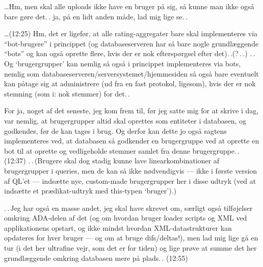 \documentclass{report}
\begin{document}
\ldots Hm, men skal alle uploads ikke have en bruger på sig, så kunne man ikke også bare gøre det.\,. ja, på en lidt anden måde, lad mig lige se.\,. 

\ldots (12:25) Hm, det er ligefør, at alle rating-aggregater bare skal implementeres via ``bot-brugere'' i princippet (og databaseserveren har så bare nogle grundlæggende ``bots'' og kan også oprette flere, hvis der er nok efterspørgsel efter det).\,.(?\,.\,.) 
.\,.\,Og `brugergrupper' kan nemlig så også i princippet implementeres via bots, nemlig som databaseserveren/serversystemet/hjemmesiden så også bare eventuelt kan påtage sig at administrere (ud fra en fast protokol, ligesom), hvis der er nok stemning (som i: nok stemmer) for det.\,. 

For ja, noget af det seneste, jeg kom frem til, før jeg satte mig for at skrive i dag, var nemlig, at brugergrupper altid skal oprettes som entiteter i databasen, og godkendes, før de kan tages i brug. Og derfor kan dette jo også sagtens implementeres ved, at databasen så godkender en brugergruppe ved at oprette en bot til at oprette og vedligeholde stemmer samlet fra denne brugergruppe.\,. (12:37) .\,.\,(Brugere skal dog stadig kunne lave linearkombinationer af brugergrupper i queries, men de kan så ikke nødvendigvis --- ikke i første version af QL'et --- indsætte nye, custom-made brugergrupper her i disse udtryk (ved at indsætte et prædikat-udtryk med this-typen `bruger').)

.\,.\,Jeg har også en masse andet, jeg skal have skrevet om, særligt også tilføjelser omkring ADA-delen af det (og om hvordan bruger loader scripts og XML ved applikationens opstart, og ikke mindst hvordan XML-datastrukturer kan opdateres for hver bruger --- og om at bruge difs/deltas!), men lad mig lige gå en tur (i det her ultrafine vejr, som det er for tiden) og lige prøve at summe det her grundlæggende omkring databasen mere på plads.\,. (12:55)
\end{document}
